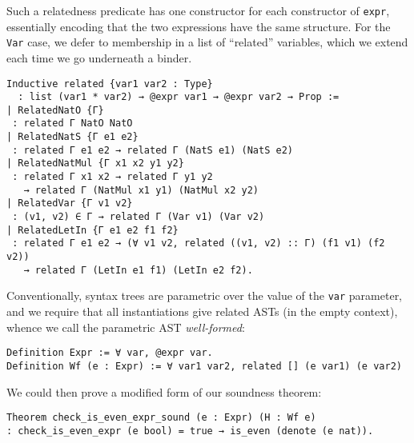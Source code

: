 Such a relatedness predicate has one constructor for each constructor of \texttt{expr}, essentially encoding that the two expressions have the same structure.
For the \texttt{Var} case, we defer to membership in a list of ``related'' variables, which we extend each time we go underneath a binder.
\begin{verbatim}
Inductive related {var1 var2 : Type}
  : list (var1 * var2) → @expr var1 → @expr var2 → Prop :=
| RelatedNatO {Γ}
 : related Γ NatO NatO
| RelatedNatS {Γ e1 e2}
 : related Γ e1 e2 → related Γ (NatS e1) (NatS e2)
| RelatedNatMul {Γ x1 x2 y1 y2}
 : related Γ x1 x2 → related Γ y1 y2
   → related Γ (NatMul x1 y1) (NatMul x2 y2)
| RelatedVar {Γ v1 v2}
 : (v1, v2) ∈ Γ → related Γ (Var v1) (Var v2)
| RelatedLetIn {Γ e1 e2 f1 f2}
 : related Γ e1 e2 → (∀ v1 v2, related ((v1, v2) :: Γ) (f1 v1) (f2 v2))
   → related Γ (LetIn e1 f1) (LetIn e2 f2).
\end{verbatim}

Conventionally, syntax trees are parametric over the value of the \texttt{var} parameter, and we require that all instantiations give related ASTs (in the empty context), whence we call the parametric AST \emph{well-formed}:
\begin{verbatim}
Definition Expr := ∀ var, @expr var.
Definition Wf (e : Expr) := ∀ var1 var2, related [] (e var1) (e var2)
\end{verbatim}
\label{sec:PHOAS:Wf-def}

We could then prove a modified form of our soundness theorem:
\begin{verbatim}
Theorem check_is_even_expr_sound (e : Expr) (H : Wf e)
: check_is_even_expr (e bool) = true → is_even (denote (e nat)).
\end{verbatim}


